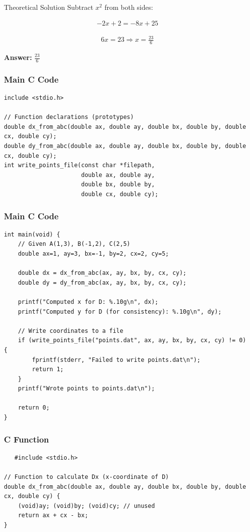 \documentclass{beamer}
\begin{document}
\begin{frame}{Theoretical Solution}
Subtract $x^2$ from both sides:

\begin{align}
-2x + 2 = -8x + 25
\end{align}

\begin{align}
6x = 23 \Rightarrow x = \frac{23}{6}
\end{align}

\textbf{Answer:} $ \boxed{\frac{23}{6}} $
\end{frame}

\begin{frame}[fragile]
\frametitle{Main C Code}
   \begin{lstlisting}
include <stdio.h>

// Function declarations (prototypes)
double dx_from_abc(double ax, double ay, double bx, double by, double cx, double cy);
double dy_from_abc(double ax, double ay, double bx, double by, double cx, double cy);
int write_points_file(const char *filepath,
                      double ax, double ay,
                      double bx, double by,
                      double cx, double cy);
   \end{lstlisting}
	\end{frame}
\begin{frame}[fragile]
\frametitle{Main C Code}
   \begin{lstlisting}
int main(void) {
    // Given A(1,3), B(-1,2), C(2,5)
    double ax=1, ay=3, bx=-1, by=2, cx=2, cy=5;

    double dx = dx_from_abc(ax, ay, bx, by, cx, cy);
    double dy = dy_from_abc(ax, ay, bx, by, cx, cy);

    printf("Computed x for D: %.10g\n", dx);
    printf("Computed y for D (for consistency): %.10g\n", dy);

    // Write coordinates to a file
    if (write_points_file("points.dat", ax, ay, bx, by, cx, cy) != 0) {
        fprintf(stderr, "Failed to write points.dat\n");
        return 1;
    }
    printf("Wrote points to points.dat\n");

    return 0;
}
   \end{lstlisting}
\end{frame}

\begin{frame}[fragile]
\frametitle{C Function}
   \begin{lstlisting}
   #include <stdio.h>

// Function to calculate Dx (x-coordinate of D)
double dx_from_abc(double ax, double ay, double bx, double by, double cx, double cy) {
    (void)ay; (void)by; (void)cy; // unused
    return ax + cx - bx;
}
   \end{lstlisting}
\end{frame}
\end{document}
